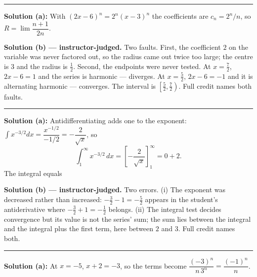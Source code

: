 \documentclass[12pt]{article}
\begin{document}
\vspace{0.2cm}\noindent\rule{\linewidth}{0.2pt}\vspace{0.2cm}


\textbf{Solution (a):} With $(2x-6)^n = 2^n(x-3)^n$ the coefficients are $c_n = 2^n/n$, so $R = \lim \dfrac{n+1}{2n}$. 

\textbf{Solution (b) --- instructor-judged.} Two faults. First, the coefficient $2$ on the variable was never factored out, so the radius came out twice too large; the centre is $3$ and the radius is $\frac12$. Second, the endpoints were never tested. At $x = \frac72$, $2x - 6 = 1$ and the series is harmonic --- diverges. At $x = \frac52$, $2x - 6 = -1$ and it is alternating harmonic --- converges. The interval is $\left[\frac52, \frac72\right)$. Full credit names both faults.

\vspace{0.2cm}\noindent\rule{\linewidth}{0.2pt}\vspace{0.2cm}


\textbf{Solution (a):} Antidifferentiating adds one to the exponent: $\int x^{-3/2}dx = \dfrac{x^{-1/2}}{-1/2} = -\dfrac{2}{\sqrt{x}}$, so
\[ \int_1^{\infty} x^{-3/2}\,dx = \left[-\frac{2}{\sqrt{x}}\right]_1^{\infty} = 0 + 2. \]
The integral equals 

\textbf{Solution (b) --- instructor-judged.} Two errors. (i) The exponent was decreased rather than increased: $-\frac32 - 1 = -\frac52$ appears in the student's antiderivative where $-\frac32 + 1 = -\frac12$ belongs. (ii) The integral test decides convergence but its value is not the series' sum; the sum lies between the integral and the integral plus the first term, here between $2$ and $3$. Full credit names both.

\vspace{0.2cm}\noindent\rule{\linewidth}{0.2pt}\vspace{0.2cm}


\textbf{Solution (a):} At $x = -5$, $x + 2 = -3$, so the terms become $\dfrac{(-3)^n}{n\,3^n} = \dfrac{(-1)^n}{n}$. 
\end{document}
